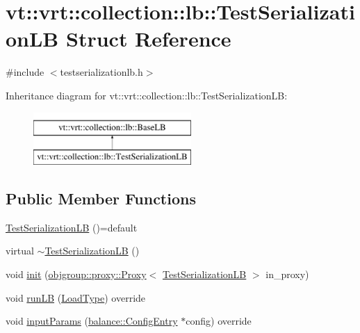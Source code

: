 \hypertarget{structvt_1_1vrt_1_1collection_1_1lb_1_1_test_serialization_l_b}{}\section{vt\+:\+:vrt\+:\+:collection\+:\+:lb\+:\+:Test\+Serialization\+LB Struct Reference}
\label{structvt_1_1vrt_1_1collection_1_1lb_1_1_test_serialization_l_b}


{\ttfamily \#include $<$testserializationlb.\+h$>$}

Inheritance diagram for vt\+:\+:vrt\+:\+:collection\+:\+:lb\+:\+:Test\+Serialization\+LB\+:\begin{figure}[H]
\begin{center}
\leavevmode
\includegraphics[height=2.000000cm]{structvt_1_1vrt_1_1collection_1_1lb_1_1_test_serialization_l_b}
\end{center}
\end{figure}
\subsection*{Public Member Functions}
\begin{DoxyCompactItemize}
\item 
\hyperlink{structvt_1_1vrt_1_1collection_1_1lb_1_1_test_serialization_l_b_ae484c610a000141d0168d29da8ee8e08}{Test\+Serialization\+LB} ()=default
\item 
virtual \hyperlink{structvt_1_1vrt_1_1collection_1_1lb_1_1_test_serialization_l_b_aa90398f1c00e00b6cb422e42d8c7860c}{$\sim$\+Test\+Serialization\+LB} ()
\item 
void \hyperlink{structvt_1_1vrt_1_1collection_1_1lb_1_1_test_serialization_l_b_ac19e5c9f52661444430932018eadce68}{init} (\hyperlink{structvt_1_1objgroup_1_1proxy_1_1_proxy}{objgroup\+::proxy\+::\+Proxy}$<$ \hyperlink{structvt_1_1vrt_1_1collection_1_1lb_1_1_test_serialization_l_b}{Test\+Serialization\+LB} $>$ in\+\_\+proxy)
\item 
void \hyperlink{structvt_1_1vrt_1_1collection_1_1lb_1_1_test_serialization_l_b_afb9f6848d8ea2432e2121a32aee56d54}{run\+LB} (\hyperlink{namespacevt_a8fb51741340b87d7aaee0bef60e9896b}{Load\+Type}) override
\item 
void \hyperlink{structvt_1_1vrt_1_1collection_1_1lb_1_1_test_serialization_l_b_a6d1150f9af14ef8ab51235eaed94c6bf}{input\+Params} (\hyperlink{structvt_1_1vrt_1_1collection_1_1balance_1_1_config_entry}{balance\+::\+Config\+Entry} $\ast$config) override
\end{DoxyCompactItemize}
